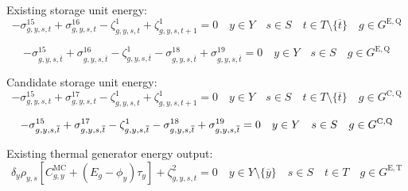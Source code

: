 \documentclass{article}
\newcommand{\sGeneratorsExistingThermal}{G^{\mathrm{E,T}}}
\newcommand{\sStorageExisting}{G^{\mathrm{E,Q}}}
\newcommand{\sStorageCandidate}{G^{\mathrm{C,Q}}}
\newcommand{\sYears}{Y}
\newcommand{\sScenarios}{S}
\newcommand{\sIntervals}{T}
\newcommand{\iGenerator}{g}
\newcommand{\iYear}{y}
\newcommand{\iYearTerminal}{\overline{\iYear}}
\newcommand{\iScenario}{s}
\newcommand{\iInterval}{t}
\newcommand{\iIntervalTerminal}{\overline{\iInterval}}
\newcommand{\cScenarioDuration}[1][\iYear,\iScenario]{\rho_{#1}}
\newcommand{\cMarginalCost}[1][\iGenerator,\iYear]{C^{\mathrm{MC}}_{#1}}
\newcommand{\cEmissionsIntensity}[1][\iGenerator]{E_{#1}}
\newcommand{\cDiscountRate}[1][\iYear]{\delta_{#1}}
\newcommand{\vBaseline}[1][\iYear]{\phi_{#1}}
\newcommand{\vPermitPrice}[1][\iYear]{\tau_{#1}}
\newcommand{\dNonNegativeStorageEnergy}[1][\iGenerator,\iYear,\iScenario,\iInterval]{\sigma_{#1}^{15}}
\newcommand{\dMaxStorageEnergyExisting}[1][\iGenerator,\iYear,\iScenario,\iInterval]{\sigma_{#1}^{16}}
\newcommand{\dMaxStorageEnergyCandidate}[1][\iGenerator,\iYear,\iScenario,\iInterval]{\sigma_{#1}^{17}}
\newcommand{\dMinStorageEnergyIntervalEnd}[1][\iGenerator,\iYear,\iScenario,\iInterval]{\sigma_{#1}^{18}}
\newcommand{\dMaxStorageEnergyIntervalEnd}[1][\iGenerator,\iYear,\iScenario,\iInterval]{\sigma_{#1}^{19}}
\newcommand{\dStorageEnergyTransition}[1][\iGenerator,\iYear,\iScenario,\iInterval]{\zeta_{#1}^{1}}
\newcommand{\dGeneratorEnergyOutput}[1][\iGenerator,\iYear,\iScenario,\iInterval]{\zeta_{#1}^{2}}
\begin{document}
Existing storage unit energy:
\begin{equation}
- \dNonNegativeStorageEnergy + \dMaxStorageEnergyExisting - \dStorageEnergyTransition + \dStorageEnergyTransition[\iGenerator,\iYear,\iScenario,\iInterval+1] = 0 \quad \iYear \in \sYears \quad \iScenario \in \sScenarios \quad \iInterval \in \sIntervals \setminus \{\iIntervalTerminal\} \quad \iGenerator \in \sStorageExisting
\end{equation}

\begin{equation}
- \dNonNegativeStorageEnergy[\iGenerator,\iYear,\iScenario,\iIntervalTerminal] + \dMaxStorageEnergyExisting[\iGenerator,\iYear,\iScenario,\iIntervalTerminal] - \dStorageEnergyTransition[\iGenerator,\iYear,\iScenario,\iIntervalTerminal] - \dMinStorageEnergyIntervalEnd[\iGenerator,\iYear,\iScenario,\iIntervalTerminal] + \dMaxStorageEnergyIntervalEnd[\iGenerator,\iYear,\iScenario,\iIntervalTerminal] = 0 \quad \iYear \in \sYears \quad \iScenario \in \sScenarios \quad \iGenerator \in \sStorageExisting
\end{equation}

Candidate storage unit energy:
\begin{equation}
- \dNonNegativeStorageEnergy + \dMaxStorageEnergyCandidate - \dStorageEnergyTransition + \dStorageEnergyTransition[\iGenerator,\iYear,\iScenario,\iInterval+1] = 0 \quad \iYear \in \sYears \quad \iScenario \in \sScenarios \quad \iInterval \in \sIntervals \setminus \{\iIntervalTerminal\} \quad \iGenerator \in \sStorageCandidate
\end{equation}

\begin{equation}
- \dNonNegativeStorageEnergy[\iGenerator,\iYear,\iScenario,\iIntervalTerminal] + \dMaxStorageEnergyCandidate[\iGenerator,\iYear,\iScenario,\iIntervalTerminal] - \dStorageEnergyTransition[\iGenerator,\iYear,\iScenario,\iIntervalTerminal] - \dMinStorageEnergyIntervalEnd[\iGenerator,\iYear,\iScenario,\iIntervalTerminal] + \dMaxStorageEnergyIntervalEnd[\iGenerator,\iYear,\iScenario,\iIntervalTerminal] = 0 \quad \iYear \in \sYears \quad \iScenario \in \sScenarios \quad \iGenerator \in \sStorageCandidate\\
\end{equation}

Existing thermal generator energy output:
\begin{equation}
\cDiscountRate \cScenarioDuration \left[\cMarginalCost + \left(\cEmissionsIntensity - \vBaseline\right)\vPermitPrice \right]  + \dGeneratorEnergyOutput = 0 \quad \iYear \in \sYears \setminus \{\iYearTerminal\} \quad \iScenario \in \sScenarios \quad \iInterval \in \sIntervals \quad \iGenerator \in \sGeneratorsExistingThermal
\end{equation}
\end{document}
